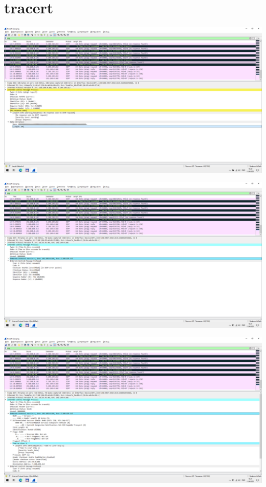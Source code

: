 
\section{tracert}

\includegraphics[width=\textwidth]{screenshots/tracert-d_ttl_request_1}

\includegraphics[width=\textwidth]{screenshots/tracert-d_ttl_response_1}

\includegraphics[width=\textwidth]{screenshots/tracert-d_ttl_response_2}

